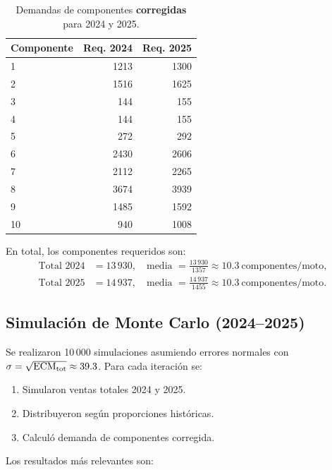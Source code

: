 \documentclass[12pt,a4paper]{article}
\newcommand{\tablesmall}{\scriptsize}
\begin{document}
\begin{table}[H]
\tablesmall
\centering
\caption{Demandas de componentes \textbf{corregidas} para 2024 y 2025.}
\label{tab:componentes_corregidos}
\begin{tabular}{@{}lrr@{}}
\toprule
Componente & Req. 2024 & Req. 2025 \\ \midrule
1  & 1213 & 1300 \\
2  & 1516 & 1625 \\
3  & 144  & 155  \\
4  & 144  & 155  \\
5  & 272  & 292  \\
6  & 2430 & 2606 \\
7  & 2112 & 2265 \\
8  & 3674 & 3939 \\
9  & 1485 & 1592 \\
10 & 940  & 1008 \\ \bottomrule
\end{tabular}
\end{table}

En total, los componentes requeridos son:
\[
\begin{aligned}
\text{Total 2024} &= 13\,930, \quad\text{media } = \frac{13\,930}{1357} \approx 10.3\ \text{componentes/moto},\\
\text{Total 2025} &= 14\,937, \quad\text{media } = \frac{14\,937}{1455} \approx 10.3\ \text{componentes/moto}.
\end{aligned}
\]

\subsection{Simulación de Monte Carlo (2024–2025)}
Se realizaron 10\,000 simulaciones asumiendo errores normales con $\sigma=\sqrt{\text{ECM}_{\rm tot}}\approx 39.3$. Para cada iteración se:
\begin{enumerate}
    \item Simularon ventas totales 2024 y 2025.
    \item Distribuyeron según proporciones históricas.
    \item Calculó demanda de componentes corregida.
\end{enumerate}
Los resultados más relevantes son:
\end{document}
